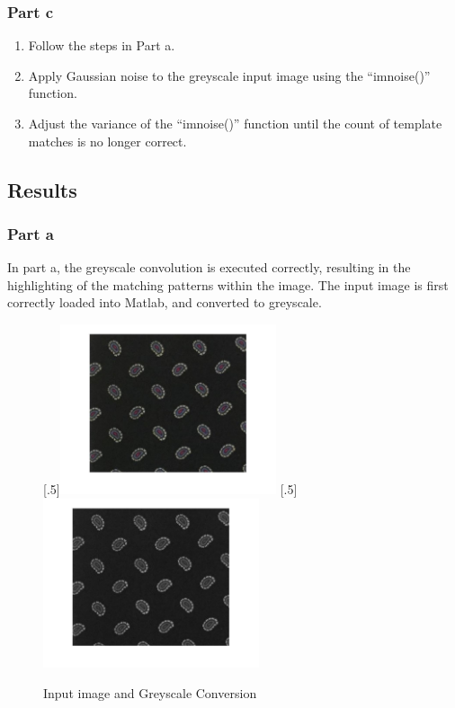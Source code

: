 \documentclass[a4paper]{article}
\begin{document}
	\subsubsection{Part c}
	\begin{enumerate}
		\item Follow the steps in Part a.
		\item Apply Gaussian noise to the greyscale input image using
			the ``imnoise()'' function.
		\item Adjust the variance of the ``imnoise()'' function until
			the count of template matches is no longer correct.
	\end{enumerate}
	\subsection{Results}
	\subsubsection{Part a}
	In part a, the greyscale convolution is executed correctly, resulting in
	the highlighting of the matching patterns within the image. The input
	image is first correctly loaded into Matlab, and converted to greyscale.
	\begin{figure}[H]
		\centering
		[.5\linewidth]{\includegraphics[height=5cm]{Results/Q3/a/qaInput.jpg}}%
		[.5\linewidth]{\includegraphics[height=5cm]{Results/Q3/a/qaInputGrey.jpg}}%
		\caption{Input image and Greyscale Conversion}
		\label{fig:}
	\end{figure}
\end{document}
